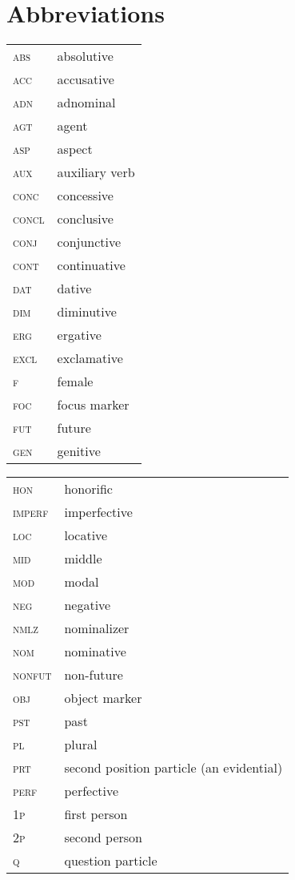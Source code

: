 \documentclass[output=paper]{LSP/langsci}
\begin{document}
\section*{Abbreviations}
\begin{tabularx}{.45\textwidth}{lQ}
\textsc{abs} &  absolutive \\%
\textsc{acc} &  accusative \\%
\textsc{adn} &  adnominal \\%
\textsc{agt} &  agent \\
\textsc{asp} &  aspect \\
\textsc{aux} &  auxiliary verb \\
\textsc{conc} &  concessive \\
\textsc{concl} &  conclusive \\
\textsc{conj} &  conjunctive \\
\textsc{cont} & continuative\\
\textsc{dat} &  dative \\
\textsc{dim} &  diminutive \\
\textsc{erg} &  ergative \\
\textsc{excl} &  exclamative \\
\textsc{f} &  female \\
\textsc{foc} & focus marker\\
\textsc{fut} &  future \\
\textsc{gen} &  genitive \\
\end{tabularx}
\begin{tabularx}{.5\textwidth}{lQ}
\textsc{hon} &  honorific\\
\textsc{imperf} &  imperfective\\
\textsc{loc} &  locative\\
\textsc{mid} &  middle\\
\textsc{mod} &  modal\\
\textsc{neg} &  negative\\
\textsc{nmlz} &  nominalizer\\
\textsc{nom} &  nominative\\
\textsc{nonfut} &  non-future\\
\textsc{obj} &  object marker\\
\textsc{pst} &  past\\
\textsc{pl} &  plural\\
\textsc{prt} &  second position particle (an evidential)\\
\textsc{perf} &  perfective\\
\textsc{1p} &  first person\\
\textsc{2p} &  second person\\
\textsc{q}& question particle\\ 
\end{tabularx}


{\sloppy
\printbibliography[heading=subbibliography,notkeyword=this] }
\end{document}
